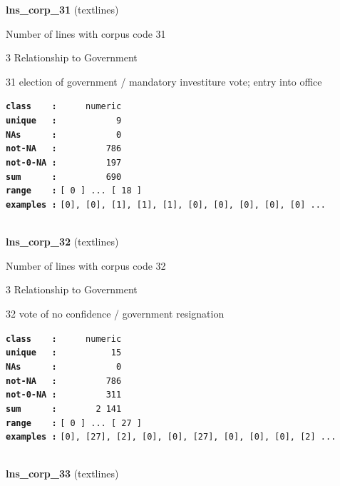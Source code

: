 \documentclass[]{article}
\begin{document}
\textbf{lns\_corp\_31} (textlines)

Number of lines with corpus code 31

3 Relationship to Government

31 election of government / mandatory investiture vote; entry into
office

\textbf{\texttt{class\ \ \ \ :}} \texttt{~~~~~numeric}\\
\textbf{\texttt{unique\ \ \ :}} \texttt{~~~~~~~~~~~9}\\
\textbf{\texttt{NAs\ \ \ \ \ \ :}} \texttt{~~~~~~~~~~~0}\\
\textbf{\texttt{not-NA\ \ \ :}} \texttt{~~~~~~~~~786}\\
\textbf{\texttt{not-0-NA\ :}} \texttt{~~~~~~~~~197}\\
\textbf{\texttt{sum\ \ \ \ \ \ :}} \texttt{~~~~~~~~~690}\\
\textbf{\texttt{range\ \ \ \ :}}
\texttt{{[}\ 0\ {]}\ ...\ {[}\ 18\ {]}}\\
\textbf{\texttt{examples\ :}}
\texttt{{[}0{]},\ {[}0{]},\ {[}1{]},\ {[}1{]},\ {[}1{]},\ {[}0{]},\ {[}0{]},\ {[}0{]},\ {[}0{]},\ {[}0{]}\ ...}\\

~

\textbf{lns\_corp\_32} (textlines)

Number of lines with corpus code 32

3 Relationship to Government

32 vote of no confidence / government resignation

\textbf{\texttt{class\ \ \ \ :}} \texttt{~~~~~numeric}\\
\textbf{\texttt{unique\ \ \ :}} \texttt{~~~~~~~~~~15}\\
\textbf{\texttt{NAs\ \ \ \ \ \ :}} \texttt{~~~~~~~~~~~0}\\
\textbf{\texttt{not-NA\ \ \ :}} \texttt{~~~~~~~~~786}\\
\textbf{\texttt{not-0-NA\ :}} \texttt{~~~~~~~~~311}\\
\textbf{\texttt{sum\ \ \ \ \ \ :}} \texttt{~~~~~~~2~141}\\
\textbf{\texttt{range\ \ \ \ :}}
\texttt{{[}\ 0\ {]}\ ...\ {[}\ 27\ {]}}\\
\textbf{\texttt{examples\ :}}
\texttt{{[}0{]},\ {[}27{]},\ {[}2{]},\ {[}0{]},\ {[}0{]},\ {[}27{]},\ {[}0{]},\ {[}0{]},\ {[}0{]},\ {[}2{]}\ ...}\\

~

\textbf{lns\_corp\_33} (textlines)
\end{document}
